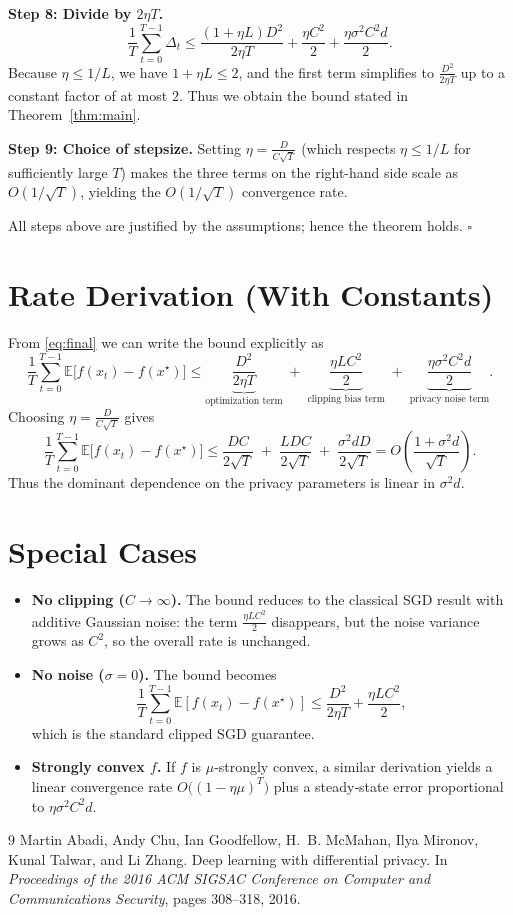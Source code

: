 \documentclass{article}
\newcommand{\E}{\mathbb{E}}
\begin{document}
\noindent\textbf{Step 8: Divide by $2\eta T$.}
\[
\frac{1}{T}\sum_{t=0}^{T-1}\Delta_t
\le
\frac{(1+\eta L)D^{2}}{2\eta T}
+\frac{\eta C^{2}}{2}
+\frac{\eta\sigma^{2}C^{2}d}{2}. \tag{9}\label{eq:final}
\]
Because $\eta\le 1/L$, we have $1+\eta L\le 2$, and the first term simplifies to $\frac{D^{2}}{2\eta T}$ up to a constant factor of at most $2$.
Thus we obtain the bound stated in Theorem~\ref{thm:main}.

\noindent\textbf{Step 9: Choice of stepsize.}
Setting $\eta = \frac{D}{C\sqrt{T}}$ (which respects $\eta\le 1/L$ for sufficiently large $T$) makes the three terms on the right-hand side scale as $O(1/\sqrt{T})$, yielding the $O(1/\sqrt{T})$ convergence rate.

All steps above are justified by the assumptions; hence the theorem holds. $\square$

\section*{Rate Derivation (With Constants)}
From \eqref{eq:final} we can write the bound explicitly as
\[
\frac{1}{T}\sum_{t=0}^{T-1}\E\bigl[f(x_t)-f(x^{\star})\bigr]
\le
\underbrace{\frac{D^{2}}{2\eta T}}_{\text{optimization term}}
\;+\;
\underbrace{\frac{\eta L C^{2}}{2}}_{\text{clipping bias term}}
\;+\;
\underbrace{\frac{\eta\sigma^{2}C^{2}d}{2}}_{\text{privacy noise term}}.
\]
Choosing $\eta = \frac{D}{C\sqrt{T}}$ gives
\[
\frac{1}{T}\sum_{t=0}^{T-1}\E\bigl[f(x_t)-f(x^{\star})\bigr]
\le
\frac{DC}{2\sqrt{T}}
\;+\;
\frac{L D C}{2\sqrt{T}}
\;+\;
\frac{\sigma^{2} d D}{2\sqrt{T}}
=O\!\left(\frac{1+\sigma^{2}d}{\sqrt{T}}\right).
\]
Thus the dominant dependence on the privacy parameters is linear in $\sigma^{2}d$.

\section*{Special Cases}
\begin{itemize}
\item \textbf{No clipping ($C\to\infty$).} The bound reduces to the classical SGD result with additive Gaussian noise: the term $\frac{\eta L C^{2}}{2}$ disappears, but the noise variance grows as $C^{2}$, so the overall rate is unchanged.
\item \textbf{No noise ($\sigma=0$).} The bound becomes
\[
\frac{1}{T}\sum_{t=0}^{T-1}\E[f(x_t)-f(x^{\star})]
\le \frac{D^{2}}{2\eta T}+\frac{\eta L C^{2}}{2},
\]
which is the standard clipped SGD guarantee.
\item \textbf{Strongly convex $f$.} If $f$ is $\mu$‑strongly convex, a similar derivation yields a linear convergence rate $O\bigl((1-\eta\mu)^{T}\bigr)$ plus a steady‑state error proportional to $\eta\sigma^{2}C^{2}d$.
\end{itemize}

\begin{thebibliography}{9}
Martin Abadi, Andy Chu, Ian Goodfellow, H.~B. McMahan, Ilya Mironov, Kunal Talwar, and Li Zhang.
\newblock Deep learning with differential privacy.
\newblock In \emph{Proceedings of the 2016 ACM SIGSAC Conference on Computer and Communications Security}, pages 308--318, 2016.
\end{thebibliography}
\end{document}
